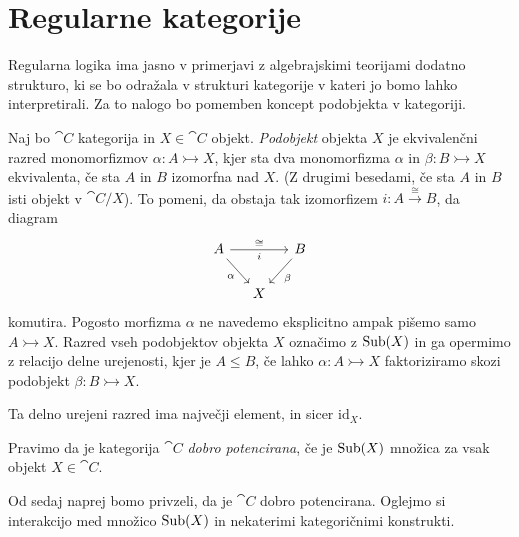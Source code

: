 \documentclass[../kategoricna_logika.tex]{subfiles}
\begin{document}
\section{Regularne kategorije}
Regularna logika ima jasno v primerjavi z algebrajskimi teorijami dodatno strukturo, ki se bo odražala v strukturi kategorije v kateri jo bomo lahko interpretirali.
Za to nalogo bo pomemben koncept podobjekta v kategoriji.
\begin{definicija}
 Naj bo $\cat{C}$ kategorija in $X \in \cat{C}$ objekt.
 \emph{Podobjekt} objekta $X$ je ekvivalenčni razred monomorfizmov $\alpha : A \rightarrowtail X$, kjer sta dva monomorfizma $\alpha$ in $\beta : B \rightarrowtail X$ ekvivalenta, če sta $A$ in $B$ izomorfna nad $X$.
 (Z drugimi besedami, če sta $A$ in $B$ isti objekt v $\cat{C}/X$). To pomeni, da obstaja tak izomorfizem $i : A \xrightarrow{\cong} B$, da diagram
 \begin{equation*}
   \begin{tikzcd}[column sep=small]
     A \ar[rr, "i"']{a}{\cong} \ar[dr, "\alpha"'] & & B \ar[dl, "\beta"] \\
     & X &
   \end{tikzcd}
 \end{equation*}
 komutira. Pogosto morfizma $\alpha$ ne navedemo eksplicitno ampak pišemo samo $A \rightarrowtail X$.
 Razred vseh podobjektov objekta $X$ označimo z $\operatorname{Sub}(X)$ in ga opermimo z relacijo delne urejenosti,
 kjer je $A \leq B$, če lahko $\alpha : A \rightarrowtail X$ faktoriziramo skozi podobjekt 
 $\beta : B \rightarrowtail X$.
\end{definicija}
Ta delno urejeni razred ima največji element, in sicer $\mathrm{id}_X$.
\begin{definicija}
    Pravimo da je kategorija $\cat{C}$ \emph{dobro potencirana}, če je $\operatorname{Sub}(X)$ množica za vsak objekt $X \in \cat{C}$.
\end{definicija}
Od sedaj naprej bomo privzeli, da je $\cat{C}$ dobro potencirana. Oglejmo si interakcijo med množico $\operatorname{Sub}(X)$ in nekaterimi kategoričnimi konstrukti.
\end{document}
